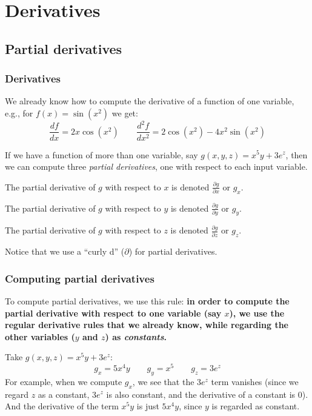 \section{Derivatives}
\subsection{Partial derivatives}

\begin{frame}
\frametitle{Derivatives}

We already know how to compute the derivative of a function of one variable, e.g., for $f(x)=\sin(x^2)$ we get:
\[\frac{d f}{dx}=2x\cos(x^2) \qquad \frac{d^2 f}{dx^2}=2\cos(x^2)-4x^2\sin(x^2)\]

If we have a function of more than one variable, say $g(x,y,z)=x^5y+3e^z$, then we can compute three \textit{partial derivatives}, one with respect to each input variable.

The partial derivative of $g$ with respect to $x$ is denoted $\frac{\partial g}{\partial x}$ or $g_x$.

The partial derivative of $g$ with respect to $y$ is denoted $\frac{\partial g}{\partial y}$ or $g_y$.

The partial derivative of $g$ with respect to $z$ is denoted $\frac{\partial g}{\partial z}$ or $g_z$.

Notice that we use a ``curly d'' ($\partial$) for partial derivatives.

\end{frame}

\begin{frame}
\frametitle{Computing partial derivatives}

To compute partial derivatives, we use this rule: \textbf{in order to compute the partial derivative with respect to one variable (say $x$), we use the regular derivative rules that we already know, while regarding the other variables ($y$ and $z$) as \textit{constants}.}

\vspace{3mm}Take $g(x,y,z)=x^5y+3e^z$:
\[g_x = 5x^4y\qquad g_y=x^5\qquad g_z=3e^z\]
For example, when we compute $g_x$, we see that the $3e^z$ term vanishes (since we regard $z$ as a constant, $3e^z$ is also constant, and the derivative of a constant is $0$). And the derivative of the term $x^5y$ is just $5x^4y$, since $y$ is regarded as constant.

\end{frame}


